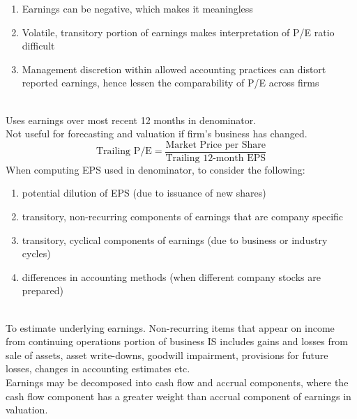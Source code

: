\begin{remark} 
\begin{enumerate}[label=\roman*.]
\setlength{\itemsep}{0pt}
\item Earnings can be negative, which makes it meaningless
\item Volatile, transitory portion of earnings makes interpretation of P/E ratio difficult
\item Management discretion within allowed accounting practices can distort reported earnings, hence lessen the comparability of P/E across firms
\end{enumerate}
\end{remark}

\begin{definition} \\
Uses earnings over most recent 12 months in denominator.\\
Not useful for forecasting and valuation if firm's business has changed.
\begin{equation}
\text{Trailing P/E} = \frac{\text{Market Price per Share}}{\text{Trailing }12\text{-month EPS}} \nonumber
\end{equation}
When computing EPS used in denominator, to consider the following:
\begin{enumerate}[label=\roman*.]
\setlength{\itemsep}{0pt}
\item potential dilution of EPS (due to issuance of new shares)
\item transitory, non-recurring components of earnings that are company specific
\item transitory, cyclical components of earnings (due to business or industry cycles)
\item differences in accounting methods (when different company stocks are prepared)
\end{enumerate}
\end{definition}

\begin{remark} \\
To estimate underlying earnings. Non-recurring items that appear on income from continuing operations portion of business IS includes gains and losses from sale of assets, asset write-downs, goodwill impairment, provisions for future losses, changes in accounting estimates etc.\\
Earnings may be decomposed into cash flow and accrual components, where the cash flow component has a greater weight than accrual component of earnings in valuation.
\end{remark}

